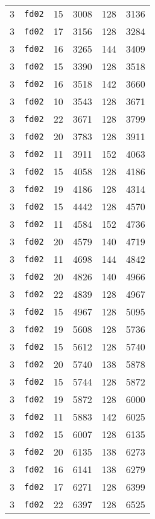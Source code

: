 \documentclass{article}
\begin{document}
\begin{table}[h!]
\begin{tabular}{llrrrl}
    3 & \texttt{fd02} & 15 & 3008 & 128 & 3136 \\
    3 & \texttt{fd02} & 17 & 3156 & 128 & 3284 \\
    3 & \texttt{fd02} & 16 & 3265 & 144 & 3409 \\
    3 & \texttt{fd02} & 15 & 3390 & 128 & 3518 \\
    3 & \texttt{fd02} & 16 & 3518 & 142 & 3660 \\
    3 & \texttt{fd02} & 10 & 3543 & 128 & 3671 \\
    3 & \texttt{fd02} & 22 & 3671 & 128 & 3799 \\
    3 & \texttt{fd02} & 20 & 3783 & 128 & 3911 \\
    3 & \texttt{fd02} & 11 & 3911 & 152 & 4063 \\
    3 & \texttt{fd02} & 15 & 4058 & 128 & 4186 \\
    3 & \texttt{fd02} & 19 & 4186 & 128 & 4314 \\
    3 & \texttt{fd02} & 15 & 4442 & 128 & 4570 \\
    3 & \texttt{fd02} & 11 & 4584 & 152 & 4736 \\
    3 & \texttt{fd02} & 20 & 4579 & 140 & 4719 \\
    3 & \texttt{fd02} & 11 & 4698 & 144 & 4842 \\
    3 & \texttt{fd02} & 20 & 4826 & 140 & 4966 \\
    3 & \texttt{fd02} & 22 & 4839 & 128 & 4967 \\
    3 & \texttt{fd02} & 15 & 4967 & 128 & 5095 \\
    3 & \texttt{fd02} & 19 & 5608 & 128 & 5736 \\
    3 & \texttt{fd02} & 15 & 5612 & 128 & 5740 \\
    3 & \texttt{fd02} & 20 & 5740 & 138 & 5878 \\
    3 & \texttt{fd02} & 15 & 5744 & 128 & 5872 \\
    3 & \texttt{fd02} & 19 & 5872 & 128 & 6000 \\
    3 & \texttt{fd02} & 11 & 5883 & 142 & 6025 \\
    3 & \texttt{fd02} & 15 & 6007 & 128 & 6135 \\
    3 & \texttt{fd02} & 20 & 6135 & 138 & 6273 \\
    3 & \texttt{fd02} & 16 & 6141 & 138 & 6279 \\
    3 & \texttt{fd02} & 17 & 6271 & 128 & 6399 \\
    3 & \texttt{fd02} & 22 & 6397 & 128 & 6525 \\

\end{tabular}
\end{table}
\end{document}
